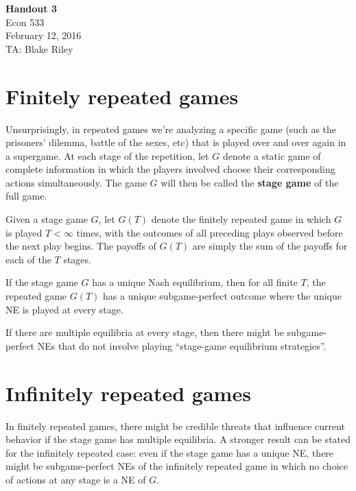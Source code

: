 \documentclass[10pt]{article}
\def\HandoutNumber{3}
\def\TheDate{February 12, 2016}
\def\Name{Blake Riley}
\begin{document}
\begin{spacing}{1.0}

\noindent
\textbf{Handout \HandoutNumber} \\
Econ 533 \\
\TheDate \\
TA: \Name \\

\section{Finitely repeated games}

Unsurprisingly, in repeated games we're analyzing a
specific game (such as the prisoners' dilemma, battle of
the sexes, etc) that is played over and over again in a
supergame. At each stage of the repetition, let $G$
denote a static game of complete information in which the
players involved choose their corresponding actions
simultaneously. The game $G$ will then be called the
\textbf{stage game} of the full game.

\begin{definition}
  Given a stage game $G$, let $G(T)$ denote the finitely
  repeated game in which $G$ is played $T<\infty$ times,
  with the outcomes of all preceding plays observed
  before the next play begins. The payoffs of $G(T)$ are
  simply the sum of the payoffs for each of the $T$ stages.
\end{definition}

\begin{theorem}
  If the stage game $G$ has a unique Nash equilibrium,
  then for all finite $T$, the repeated game $G(T)$ has a
  unique subgame-perfect outcome where the unique NE is
  played at every stage.
\end{theorem}

If there are multiple equilibria at every
stage, then there might be subgame-perfect NEs that do
not involve playing ``stage-game equilibrium
strategies''.

\section{Infinitely repeated games}

In finitely repeated games, there might be credible threats that influence
current behavior if the stage game has multiple equilibria. A stronger
result can be stated for the infinitely repeated case: even if the stage
game has a unique NE, there might be subgame-perfect NEs of the infinitely
repeated game in which no choice of actions at any stage is a NE of $G$.


\end{spacing}
\end{document}
